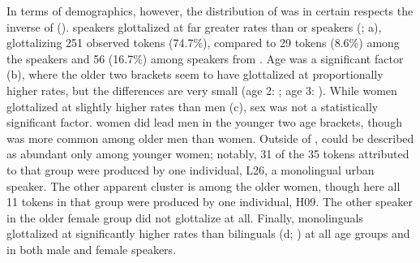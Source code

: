 \documentclass[output=paper,colorlinks,citecolor=brown]{langscibook}
\begin{document}
In terms of demographics, however, the distribution of  was in certain respects the inverse of  ().  speakers glottalized at far greater rates than  or  speakers (; a), glottalizing 251 observed tokens (74.7\%), compared to 29 tokens (8.6\%) among the  speakers and 56 (16.7\%) among speakers from . Age was a significant factor (b), where the older two brackets seem to have glottalized at proportionally higher rates, but the differences are very small (age 2:  ; age 3: ). While women glottalized at slightly higher rates than men (c), sex was not a statistically significant factor.  women did lead  men in the younger two age brackets, though  was more common among older  men than women. Outside of ,  could be described as abundant only among younger  women; notably, 31 of the 35 tokens attributed to that group were produced by one individual, L26, a monolingual urban speaker. The other apparent cluster is among the older  women, though here all 11 tokens in that group were produced by one individual, H09. The other speaker in the older female  group did not glottalize at all. Finally, monolinguals glottalized at significantly higher rates than bilinguals (d; ) at all age groups and in both male and female speakers.
\end{document}
